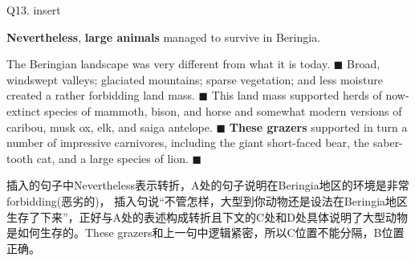\begin{blk}
    \begin{qst}
        Q13. insert
    \end{qst}

    \begin{chc}
        \textbf{Nevertheless}, \textbf{large animals} managed to survive in Beringia.
    \end{chc}

    \begin{psgq}
        The Beringian landscape was very different from what it is today. $\blacksquare$ Broad, windswept valleys; glaciated mountains; sparse vegetation; and less moisture created a rather forbidding land mass. $\blacksquare$ This land mass supported herds of now-extinct species of mammoth, bison, and horse and somewhat modern versions of caribou, musk ox, elk, and saiga antelope. $\blacksquare$ \textbf{These grazers} supported in turn a number of impressive carnivores, including the giant short-faced bear, the saber-tooth cat, and a large species of lion. $\blacksquare$
    \end{psgq}

    \begin{nlz}
        插入的句子中Nevertheless表示转折，A处的句子说明在Beringia地区的环境是非常forbidding(恶劣的)， 插入句说“不管怎样，大型到你动物还是设法在Beringia地区生存了下来”，正好与A处的表述构成转折且下文的C处和D处具体说明了大型动物是如何生存的。These grazers和上一句中逻辑紧密，所以C位置不能分隔，B位置正确。
    \end{nlz}
\end{blk}

\newpage